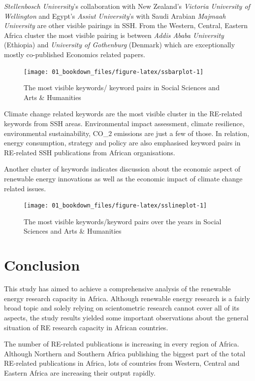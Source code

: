 \documentclass[
]{book}
\begin{document}
\emph{Stellenbosch University}'s collaboration with New Zealand's \emph{Victoria University of Wellington} and Egypt's \emph{Assiut University}'s with Saudi Arabian \emph{Majmaah University} are other visible pairings in SSH. From the Western, Central, Eastern Africa cluster the most visible pairing is between \emph{Addis Ababa University} (Ethiopia) and \emph{University of Gothenburg} (Denmark) which are exceptionally mostly co-published Economics related papers.

\begin{figure}
\texttt{[image: 01\_bookdown\_files/figure-latex/ssbarplot-1]} \caption{The most visible keywords/ keyword pairs in Social Sciences and Arts & Humanities}\label{fig:ssbarplot}
\end{figure}

Climate change related keywords are the most visible cluster in the RE-related keywords from SSH areas. Environmental impact assessment, climate resilience, environmental sustainability, CO\_2 emissions are just a few of those. In relation, energy consumption, strategy and policy are also emphasised keyword pairs in RE-related SSH publications from African organisations.

Another cluster of keywords indicates discussion about the economic aspect of renewable energy innovations as well as the economic impact of climate change related issues.

\begin{figure}
\texttt{[image: 01\_bookdown\_files/figure-latex/sslineplot-1]} \caption{The most visible keywords/keyword pairs over the years in Social Sciences and Arts & Humanities}\label{fig:sslineplot}
\end{figure}

\hypertarget{conclusion}{%
\chapter{Conclusion}\label{conclusion}}

This study has aimed to achieve a comprehensive analysis of the renewable energy research capacity in Africa. Although renewable energy research is a fairly broad topic and solely relying on scientometric research cannot cover all of its aspects, the study results yielded some important observations about the general situation of RE research capacity in African countries.

The number of RE-related publications is increasing in every region of Africa. Although Northern and Southern Africa publishing the biggest part of the total RE-related publications in Africa, lots of countries from Western, Central and Eastern Africa are increasing their output rapidly.
\end{document}
